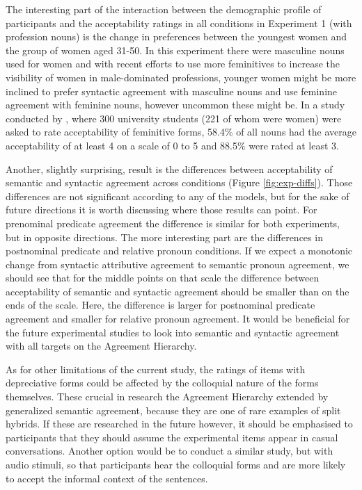 The interesting part of the interaction between the demographic profile of participants and the acceptability ratings in all conditions in Experiment 1 (with profession nouns) is the change in preferences between the youngest women and the group of women aged 31-50. In this experiment there were masculine nouns used for women and with recent efforts to use more feminitives to increase the visibility of women in male-dominated professions, younger women might be more inclined to prefer syntactic agreement with masculine nouns and use feminine agreement with feminine nouns, however uncommon these might be. In a study conducted by \cite{feminatywy2023}, where 300 university students (221 of whom were women) were asked to rate acceptability of feminitive forms, 58.4\% of all nouns had the average acceptability of at least 4 on a scale of 0 to 5 and 88.5\% were rated at least 3.

Another, slightly surprising, result is the differences between acceptability of semantic and syntactic agreement across conditions (Figure \ref{fig:exp-diffs}). Those differences are not significant according to any of the models, but for the sake of future directions it is worth discussing where those results can point. For prenominal predicate agreement the difference is similar for both experiments, but in opposite directions. The more interesting part are the differences in postnominal predicate and relative pronoun conditions. If we expect a monotonic change from syntactic attributive agreement to semantic pronoun agreement, we should see that for the middle points on that scale the difference between acceptability of semantic and syntactic agreement should be smaller than on the ends of the scale. Here, the difference is larger for postnominal predicate agreement and smaller for relative pronoun agreement. It would be beneficial for the future experimental studies to look into semantic and syntactic agreement with all targets on the Agreement Hierarchy.

As for other limitations of the current study, the ratings of items with depreciative forms could be affected by the colloquial nature of the forms themselves. These crucial in research the Agreement Hierarchy extended by generalized semantic agreement, because they are one of rare examples of split hybrids. If these are researched in the future however, it should be emphasised to participants that they should assume the experimental items appear in casual conversations. Another option would be to conduct a similar study, but with audio stimuli, so that participants hear the colloquial forms and are more likely to accept the informal context of the sentences.

